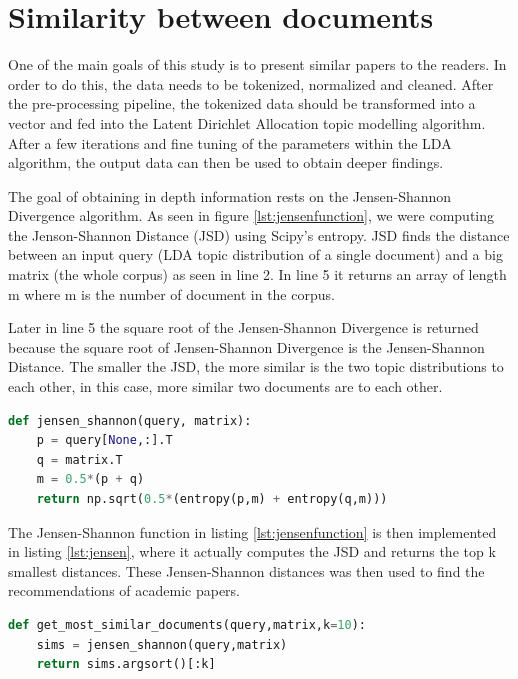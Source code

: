 \section{Similarity between documents}
One of the main goals of this study is to present similar papers to the readers. In order to do this, the data needs to be tokenized, normalized and cleaned. After the pre-processing pipeline, the tokenized data should be transformed into a vector and fed into the Latent Dirichlet Allocation topic modelling algorithm. After a few iterations and fine tuning of the parameters within the LDA algorithm, the output data can then be used to obtain deeper findings. 

The goal of obtaining in depth information rests on the Jensen-Shannon Divergence algorithm. As seen in figure \ref{lst:jensenfunction}, we were computing the Jenson-Shannon Distance (JSD) using Scipy's entropy. JSD finds the distance between an input query (LDA topic distribution of a single document) and a big matrix (the whole corpus) as seen in line 2. In line 5 it returns an array of length m where m is the number of document in the corpus. 

Later in line 5 the square root of the Jensen-Shannon Divergence is returned because the square root of Jensen-Shannon Divergence is the Jensen-Shannon Distance. The smaller the JSD, the more similar is the two topic distributions to each other, in this case, more similar two documents are to each other.
\begin{lstlisting}[language=Python, label={lst:jensenfunction}, caption=Implementation of Jensen-Shannon similarity]
def jensen_shannon(query, matrix):
    p = query[None,:].T
    q = matrix.T
    m = 0.5*(p + q)
    return np.sqrt(0.5*(entropy(p,m) + entropy(q,m)))
\end{lstlisting}
The Jensen-Shannon function in listing \ref{lst:jensenfunction} is then implemented in listing \ref{lst:jensen}, where it actually computes the JSD and returns the top k smallest distances. These Jensen-Shannon distances was then used to find the recommendations of academic papers. 

\begin{lstlisting}[language=Python, label={lst:jensen}, caption=Jensen-Shannon function]
def get_most_similar_documents(query,matrix,k=10):
    sims = jensen_shannon(query,matrix) 
    return sims.argsort()[:k]
\end{lstlisting}

